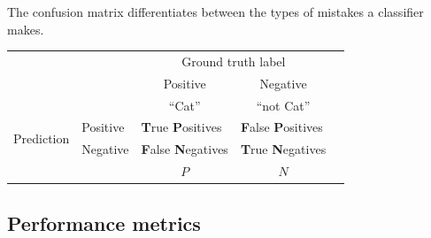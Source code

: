\begin{frame}\frametitle{\subsecname}

The confusion matrix differentiates between the types of mistakes a classifier makes.

\begin{tabular}{ll|l|l|l}
\cline{3-4}
												  &          & \multicolumn{2}{c|}{Ground truth label}                        &  \\ \cline{3-4}
												  &          & \multicolumn{1}{c|}{Positive} & \multicolumn{1}{c|}{Negative}  &  \\ \cline{3-4}
												  &          & \multicolumn{1}{c|}{``Cat''} & \multicolumn{1}{c|}{``not Cat''}  &  \\ \cline{1-4}
\multicolumn{1}{|r|}{\multirow{2}{*}{Prediction}} & Positive & \textbf{T}rue \textbf{P}ositives & \textbf{F}alse \textbf{P}ositives &  \\ \cline{2-4}
\multicolumn{1}{|r|}{}                            & Negative &  \textbf{F}alse \textbf{N}egatives & \textbf{T}rue \textbf{N}egatives &  \\ \cline{1-4}
												  &          & \multicolumn{1}{c|}{$P$} & \multicolumn{1}{c|}{$N$}  &  \\ \cline{3-4}
\end{tabular}	


\end{frame}

\subsection{Performance metrics}

